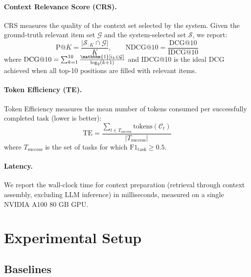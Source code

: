 \documentclass[review,12pt]{elsarticle}
\newcommand{\tokens}{\mathrm{tokens}}
\begin{document}
\paragraph{Context Relevance Score (CRS).}
CRS measures the quality of the context set selected by the system.  Given the
ground-truth relevant item set $\mathcal{G}$ and the system-selected set
$\mathcal{S}$, we report:
\begin{equation}
  \text{P@}K = \frac{|\mathcal{S}_{:K} \cap \mathcal{G}|}{K}, \qquad
  \text{NDCG@}10 = \frac{\text{DCG@}10}{\text{IDCG@}10}
  \label{eq:crs}
\end{equation}
where $\text{DCG@}10 = \sum_{k=1}^{10} \frac{\mathbbm{1}[i_k \in \mathcal{G}]}
{\log_2(k+1)}$ and IDCG@10 is the ideal DCG achieved when all top-10 positions
are filled with relevant items.

\paragraph{Token Efficiency (TE).}
Token Efficiency measures the mean number of tokens consumed per successfully
completed task (lower is better):
\begin{equation}
  \text{TE} = \frac{\sum_{t \in T_{\text{success}}} \tokens(\mathcal{C}_t)}
              {|T_{\text{success}}|}
  \label{eq:te}
\end{equation}
where $T_{\text{success}}$ is the set of tasks for which
$\text{F1}_{\text{task}} \geq 0.5$.

\paragraph{Latency.}
We report the wall-clock time for context preparation (retrieval through
context assembly, excluding LLM inference) in milliseconds, measured on a
single NVIDIA A100 80 GB GPU.

\section{Experimental Setup}
\label{sec:setup}

\subsection{Baselines}
\label{subsec:baselines}
\end{document}
